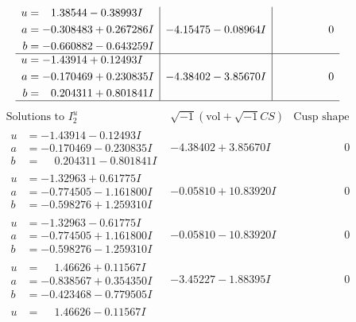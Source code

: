 \documentclass[1p]{elsarticle_modified}
\theoremstyle{definition}
\newcommand{\I}{\sqrt{-1}}
\begin{document}
$$\begin{array}{c|c|c}
\begin{aligned}
u &= \phantom{-}1.38544 - 0.38993 I \\
a &= -0.308483 + 0.267286 I \\
b &= -0.660882 - 0.643259 I\end{aligned}
 & -4.15475 - 0.08964 I & \phantom{-0.000000 } 0 \\ \hline\begin{aligned}
u &= -1.43914 + 0.12493 I \\
a &= -0.170469 + 0.230835 I \\
b &= \phantom{-}0.204311 + 0.801841 I\end{aligned}
 & -4.38402 - 3.85670 I & \phantom{-0.000000 } 0\\
 \hline 
 \end{array}$$\newpage$$\begin{array}{c|c|c}  
\text{Solutions to }I^u_{2}& \I (\text{vol} + \sqrt{-1}CS) & \text{Cusp shape}\\
 \hline 
\begin{aligned}
u &= -1.43914 - 0.12493 I \\
a &= -0.170469 - 0.230835 I \\
b &= \phantom{-}0.204311 - 0.801841 I\end{aligned}
 & -4.38402 + 3.85670 I & \phantom{-0.000000 } 0 \\ \hline\begin{aligned}
u &= -1.32963 + 0.61775 I \\
a &= -0.774505 - 1.161800 I \\
b &= -0.598276 + 1.259310 I\end{aligned}
 & -0.05810 + 10.83920 I & \phantom{-0.000000 } 0 \\ \hline\begin{aligned}
u &= -1.32963 - 0.61775 I \\
a &= -0.774505 + 1.161800 I \\
b &= -0.598276 - 1.259310 I\end{aligned}
 & -0.05810 - 10.83920 I & \phantom{-0.000000 } 0 \\ \hline\begin{aligned}
u &= \phantom{-}1.46626 + 0.11567 I \\
a &= -0.838567 + 0.354350 I \\
b &= -0.423468 - 0.779505 I\end{aligned}
 & -3.45227 - 1.88395 I & \phantom{-0.000000 } 0 \\ \hline\begin{aligned}
u &= \phantom{-}1.46626 - 0.11567 I \\

\end{aligned}
\end{array}$$
\end{document}
